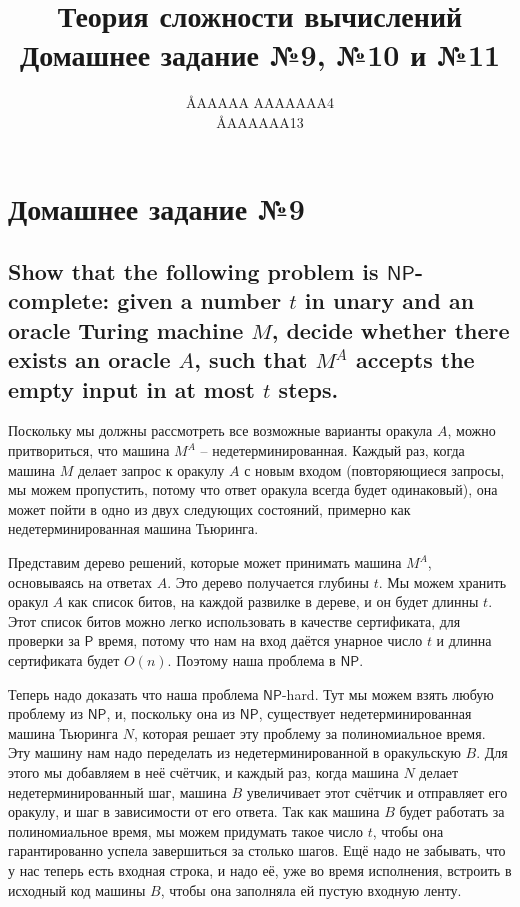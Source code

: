 \documentclass{article}
\title{Теория сложности вычислений \\ Домашнее задание №9, №10 и №11}
\author{\AA{AAAAA AAAAAAA}{4} \\ \AA{AAAAAA}{13}}
\newcommand{\NP}{\ensuremath{\mathsf{NP}}}
\renewcommand{\P}{\ensuremath{\mathsf{P}}}
\begin{document}
  \maketitle

  \setcounter{section}{8}
  \section{Домашнее задание №9}
  \setcounter{subsection}{8}
  \subsection{Show that the following problem is \NP-complete: given a number $t$ in unary and an oracle Turing machine $M$, decide whether there exists an oracle $A$, such that $M^A$ accepts the empty input in at most $t$ steps.}
  Поскольку мы должны рассмотреть все возможные варианты оракула $A$, можно притвориться, что машина $M^A$ -- недетерминированная.
  Каждый раз, когда машина $M$ делает запрос к оракулу $A$ с новым входом (повторяющиеся запросы, мы можем пропустить, потому что ответ оракула всегда будет одинаковый), она может пойти в одно из двух следующих состояний, примерно как недетерминированная машина Тьюринга.

  Представим дерево решений, которые может принимать машина $M^A$, основываясь на ответах $A$.
  Это дерево получается глубины $t$.
  Мы можем хранить оракул $A$ как список битов, на каждой развилке в дереве, и он будет длинны $t$.
  Этот список битов можно легко использовать в качестве сертификата, для проверки за \P{} время, потому что нам на вход даётся унарное число $t$ и длинна сертификата будет $O(n)$.
  Поэтому наша проблема в \NP.

  Теперь надо доказать что наша проблема \NP-hard.
  Тут мы можем взять любую проблему из \NP, и, поскольку она из \NP, существует недетерминированная машина Тьюринга $N$, которая решает эту проблему за полиномиальное время.
  Эту машину нам надо переделать из недетерминированной в оракульскую $B$.
  Для этого мы добавляем в неё счётчик, и каждый раз, когда машина $N$ делает недетерминированный шаг, машина $B$ увеличивает этот счётчик и отправляет его оракулу, и шаг в зависимости от его ответа.
  Так как машина $B$ будет работать за полиномиальное время, мы можем придумать такое число $t$, чтобы она гарантированно успела завершиться за столько шагов.
  Ещё надо не забывать, что у нас теперь есть входная строка, и надо её, уже во время исполнения, встроить в исходный код машины $B$, чтобы она заполняла ей пустую входную ленту.
\end{document}
